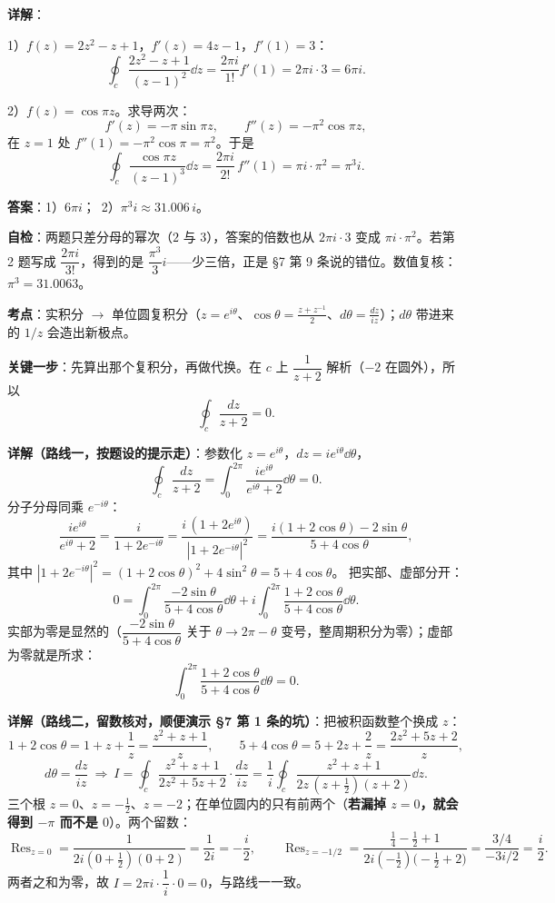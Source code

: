 \documentclass[11pt]{ctexart}
\let\origsubhdr\subhdr
\renewcommand{\subhdr}[1]{\par\needspace{4\baselineskip}\origsubhdr{#1}}
\renewcommand{\qbreak}{\needspace{0.45\textheight}}
\begin{document}
\textbf{详解}：

1）$f(z)=2z^{2}-z+1$，$f'(z)=4z-1$，$f'(1)=3$：
\[ \oint_c\frac{2z^{2}-z+1}{(z-1)^{2}}\dd z=\frac{2\pi i}{1!}f'(1)=2\pi i\cdot3=6\pi i . \]

2）$f(z)=\cos\pi z$。求导两次：
\[ f'(z)=-\pi\sin\pi z,\qquad f''(z)=-\pi^{2}\cos\pi z , \]
在 $z=1$ 处 $f''(1)=-\pi^{2}\cos\pi=\pi^{2}$。于是
\[ \oint_c\frac{\cos\pi z}{(z-1)^{3}}\dd z=\frac{2\pi i}{2!}\,f''(1)=\pi i\cdot\pi^{2}=\pi^{3}i . \]

\textbf{答案}：1）$6\pi i$；\ 2）$\pi^{3}i\approx31.006\,i$。

\textbf{自检}：两题只差分母的幂次（$2$ 与 $3$），答案的倍数也从 $2\pi i\cdot3$ 变成 $\pi i\cdot\pi^{2}$。若第 2 题写成 $\dfrac{2\pi i}{3!}$，得到的是 $\dfrac{\pi^{3}}{3}i$——少三倍，正是 §7 第 9 条说的错位。数值复核：$\pi^{3}=31.0063$。

\qbreak
{}
\label{app:hw5}

\textbf{考点}：实积分 $\to$ 单位圆复积分（$z=e^{i\theta}$、$\cos\theta=\frac{z+z^{-1}}{2}$、$d\theta=\frac{dz}{iz}$）；$d\theta$ 带进来的 $1/z$ 会造出新极点。

\textbf{关键一步}：先算出那个复积分，再做代换。在 $c$ 上 $\dfrac{1}{z+2}$ 解析（$-2$ 在圆外），所以
\[ \oint_c\frac{dz}{z+2}=0 . \]

\textbf{详解（路线一，按题设的提示走）}：参数化 $z=e^{i\theta}$，$dz=ie^{i\theta}\dd\theta$，
\[ \oint_c\frac{dz}{z+2}=\int_0^{2\pi}\frac{ie^{i\theta}}{e^{i\theta}+2}\dd\theta=0 . \]
分子分母同乘 $e^{-i\theta}$：
\[ \frac{ie^{i\theta}}{e^{i\theta}+2}=\frac{i}{1+2e^{-i\theta}}
=\frac{i\,(1+2e^{i\theta})}{|1+2e^{-i\theta}|^{2}}
=\frac{i(1+2\cos\theta)-2\sin\theta}{5+4\cos\theta} , \]
其中 $|1+2e^{-i\theta}|^{2}=(1+2\cos\theta)^{2}+4\sin^{2}\theta=5+4\cos\theta$。
把实部、虚部分开：
\[ 0=\int_0^{2\pi}\frac{-2\sin\theta}{5+4\cos\theta}\dd\theta
+i\int_0^{2\pi}\frac{1+2\cos\theta}{5+4\cos\theta}\dd\theta . \]
实部为零是显然的（$\dfrac{-2\sin\theta}{5+4\cos\theta}$ 关于 $\theta\to2\pi-\theta$ 变号，整周期积分为零）；虚部为零就是所求：
\[ \int_0^{2\pi}\frac{1+2\cos\theta}{5+4\cos\theta}\dd\theta=0 . \]

\textbf{详解（路线二，留数核对，顺便演示 §7 第 1 条的坑）}：把被积函数整个换成 $z$：
\[ 1+2\cos\theta=1+z+\frac1z=\frac{z^{2}+z+1}{z},\qquad
5+4\cos\theta=5+2z+\frac2z=\frac{2z^{2}+5z+2}{z} , \]
\[ d\theta=\frac{dz}{iz}\ \Longrightarrow\
I=\oint_c\frac{z^{2}+z+1}{2z^{2}+5z+2}\cdot\frac{dz}{iz}
=\frac{1}{i}\oint_c\frac{z^{2}+z+1}{2z\,(z+\tfrac12)(z+2)}\dd z . \]
三个根 $z=0$、$z=-\tfrac12$、$z=-2$；在单位圆内的只有前两个（\textbf{若漏掉 $z=0$，就会得到 $-\pi$ 而不是 $0$}）。两个留数：
\[ \operatorname{Res}_{z=0}=\frac{1}{2i(0+\tfrac12)(0+2)}=\frac{1}{2i}=-\frac{i}{2},\qquad
\operatorname{Res}_{z=-1/2}=\frac{\tfrac14-\tfrac12+1}{2i(-\tfrac12)\bigl(-\tfrac12+2\bigr)}=\frac{3/4}{-3i/2}=\frac{i}{2} . \]
两者之和为零，故 $I=2\pi i\cdot\dfrac{1}{i}\cdot0=0$，与路线一一致。
\end{document}
